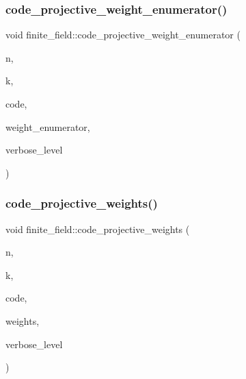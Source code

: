 \mbox{\label{classfinite__field_a5e3f482f774257b33633d792d63bce14}} 
\subsubsection{\texorpdfstring{code\+\_\+projective\+\_\+weight\+\_\+enumerator()}{code\_projective\_weight\_enumerator()}}
{\footnotesize\ttfamily void finite\+\_\+field\+::code\+\_\+projective\+\_\+weight\+\_\+enumerator (\begin{DoxyParamCaption}\item[{\mbox{\hyperlink{galois_8h_a09fddde158a3a20bd2dcadb609de11dc}{I\+NT}}}]{n,  }\item[{\mbox{\hyperlink{galois_8h_a09fddde158a3a20bd2dcadb609de11dc}{I\+NT}}}]{k,  }\item[{\mbox{\hyperlink{galois_8h_a09fddde158a3a20bd2dcadb609de11dc}{I\+NT}} $\ast$}]{code,  }\item[{\mbox{\hyperlink{galois_8h_a09fddde158a3a20bd2dcadb609de11dc}{I\+NT}} $\ast$}]{weight\+\_\+enumerator,  }\item[{\mbox{\hyperlink{galois_8h_a09fddde158a3a20bd2dcadb609de11dc}{I\+NT}}}]{verbose\+\_\+level }\end{DoxyParamCaption})}

\mbox{\label{classfinite__field_a905149a1027d52fc039a6defcf571da0}} 
\subsubsection{\texorpdfstring{code\+\_\+projective\+\_\+weights()}{code\_projective\_weights()}}
{\footnotesize\ttfamily void finite\+\_\+field\+::code\+\_\+projective\+\_\+weights (\begin{DoxyParamCaption}\item[{\mbox{\hyperlink{galois_8h_a09fddde158a3a20bd2dcadb609de11dc}{I\+NT}}}]{n,  }\item[{\mbox{\hyperlink{galois_8h_a09fddde158a3a20bd2dcadb609de11dc}{I\+NT}}}]{k,  }\item[{\mbox{\hyperlink{galois_8h_a09fddde158a3a20bd2dcadb609de11dc}{I\+NT}} $\ast$}]{code,  }\item[{\mbox{\hyperlink{galois_8h_a09fddde158a3a20bd2dcadb609de11dc}{I\+NT}} $\ast$\&}]{weights,  }\item[{\mbox{\hyperlink{galois_8h_a09fddde158a3a20bd2dcadb609de11dc}{I\+NT}}}]{verbose\+\_\+level }\end{DoxyParamCaption})}

